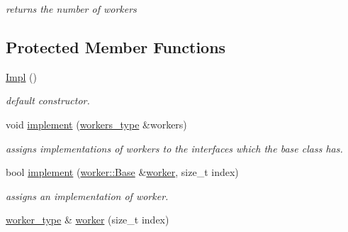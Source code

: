 \begin{DoxyCompactItemize}
\begin{DoxyCompactList}\small\item\em returns the number of workers \end{DoxyCompactList}\end{DoxyCompactItemize}
\subsection*{Protected Member Functions}
\begin{DoxyCompactItemize}
\item 
\hypertarget{group__task_gaa414ac5e76735f881871f98e288003e0}{\hyperlink{group__task_gaa414ac5e76735f881871f98e288003e0}{Impl} ()}\label{group__task_gaa414ac5e76735f881871f98e288003e0}

\begin{DoxyCompactList}\small\item\em default constructor. \end{DoxyCompactList}\item 
\hypertarget{group__task_gaf3c6d1475b000e7f2cf6b7448fc2dfdc}{void \hyperlink{group__task_gaf3c6d1475b000e7f2cf6b7448fc2dfdc}{implement} (\hyperlink{classhryky_1_1_vector}{workers\-\_\-type} \&workers)}\label{group__task_gaf3c6d1475b000e7f2cf6b7448fc2dfdc}

\begin{DoxyCompactList}\small\item\em assigns implementations of workers to the interfaces which the base class has. \end{DoxyCompactList}\item 
bool \hyperlink{classhryky_1_1task_1_1distributor_1_1_base_aaed765a0ab4b2f79082ca8b66251dc7a}{implement} (\hyperlink{classhryky_1_1task_1_1worker_1_1_base}{worker\-::\-Base} \&\hyperlink{classhryky_1_1task_1_1distributor_1_1_impl_ada35bdee49d5012cd0bc8bd398278afd}{worker}, size\-\_\-t index)
\begin{DoxyCompactList}\small\item\em assigns an implementation of worker. \end{DoxyCompactList}\item 
\hypertarget{classhryky_1_1task_1_1distributor_1_1_impl_ada35bdee49d5012cd0bc8bd398278afd}{\hyperlink{classhryky_1_1task_1_1worker_1_1_base}{worker\-\_\-type} \& \hyperlink{classhryky_1_1task_1_1distributor_1_1_impl_ada35bdee49d5012cd0bc8bd398278afd}{worker} (size\-\_\-t index)}\label{classhryky_1_1task_1_1distributor_1_1_impl_ada35bdee49d5012cd0bc8bd398278afd}


\end{DoxyCompactItemize}
